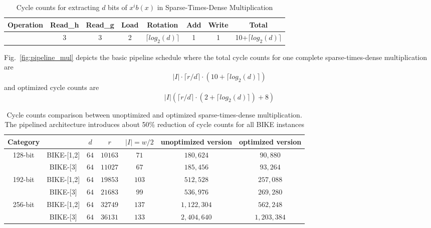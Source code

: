 \documentclass[preprint]{iacrtrans}
\begin{document}
\begin{table}[!tb]\centering
\caption{Cycle counts for extracting $d$ bits of $x^ib(x)$ in Sparse-Times-Dense Multiplication}
\begin{tabular}{c|c|c|c|c|c|c|c}
  \hline
  Operation & Read\_h & Read\_g & Load &Rotation & Add & Write & Total \\\hline
   & 3 & 3 & 2 & $\lceil log_2(d)\rceil$ & 1 & 1& 10+$\lceil log_2(d)\rceil$ \\
  \hline
\end{tabular}
\end{table}

Fig.~\ref{fig:pipeline_mul} depicts the basic pipeline schedule where the total cycle counts for one complete sparse-times-dense multiplication are
\[
    |I|\cdot\lceil r/d\rceil\cdot (10+\lceil log_2(d)\rceil)
\]
and optimized cycle counts are
\[
    |I|(\lceil r/d\rceil\cdot (2+\lceil log_2(d)\rceil) + 8)
\]

\begin{table}[!tb]\centering
\caption{Cycle counts comparison between unoptimized and optimized sparse-times-dense multiplication. The pipelined architecture introduces about 50\% reduction of cycle counts for all BIKE instances}
\begin{tabular}{cc|ccccc}
  \hline
 \textbf{Category}        &             & $d$ & $r$  & $|I|=w/2$  & unoptimized version& optimized version\\\hline
\multirow{ 2}{*}{128-bit} &  BIKE-[1,2] & $64$ & $10163$  & $71$  & $180,624$ & $90,880$\\
                          &  BIKE-[3] & $64$ & $11027$  & $67$  & $185,456$& $93,264$\\
  \hline
\multirow{ 2}{*}{192-bit} &  BIKE-[1,2] & $64$ & $19853$  & $103$  &$512,528$& $257,088$\\
                          &  BIKE-[3] & $64$ & $21683$  & $99$  &$536,976$& $269,280$\\
  \hline
\multirow{ 2}{*}{256-bit} &  BIKE-[1,2] & $64$ & $32749$  & $137$  &$1,122,304$& $562,248$\\
                          &  BIKE-[3] & $64$ & $36131$  & $133$  &$2,404,640$& $1,203,384$\\
  \hline
\end{tabular}
\end{table}
\end{document}
